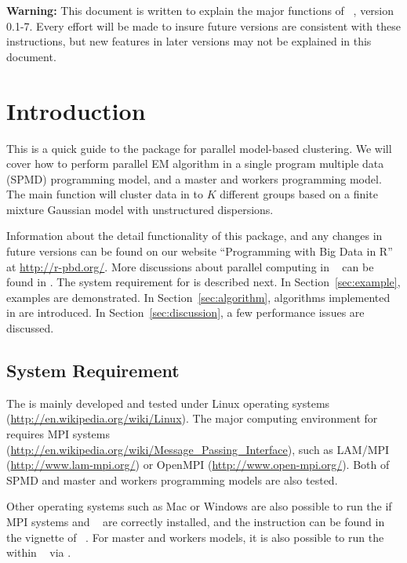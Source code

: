 
{\color{red} \bf Warning:} This document is written to explain the major
functions of
~\citep{Chen2012pmclustpackage}, version 0.1-7.
Every effort will be made to insure future versions are consistent with
these instructions, but new features in later versions may not be explained
in this document.


\section[Introduction]{Introduction}
\label{sec:introduction}

This is a quick guide to the package  for
parallel model-based clustering.
We will cover how to perform parallel EM algorithm in 
a single program multiple data (SPMD) programming model,
and a master and workers programming model.
The main function  will cluster
data in to $K$ different groups based on a finite mixture Gaussian
model with unstructured dispersions.

Information about the detail functionality of this package,
and any changes in future versions can be found on our website
``Programming with Big Data in R'' at
\url{http://r-pbd.org/}.
More discussions about parallel computing in ~\citep{Rcore}
can be found in \citet{Schmidberger2009}.
The system requirement for  is described next.
In Section~\ref{sec:example}, examples are demonstrated.
In Section~\ref{sec:algorithm}, algorithms implemented in 
are introduced. In Section~\ref{sec:discussion}, a few performance issues
are discussed.




\subsection[System Requirement]{System Requirement}
\label{sec:system_requirement}

The  is mainly developed and tested under Linux operating systems
(\url{http://en.wikipedia.org/wiki/Linux}).
The major computing environment for  requires MPI systems
(\url{http://en.wikipedia.org/wiki/Message_Passing_Interface}), such as
LAM/MPI (\url{http://www.lam-mpi.org/}) or
OpenMPI (\url{http://www.open-mpi.org/}).
Both of SPMD and master and workers programming models are also tested.

Other operating systems such as Mac or Windows are also possible to run the
 if MPI systems and ~\citep{Chen2012pbdMPIpackage}
are correctly installed, and the instruction can be found in
the vignette of ~\citep{Chen2014pbdMPIvignette}.
For master and workers models,
it is also possible to run the  within ~\citep{Yu2010}
via .

